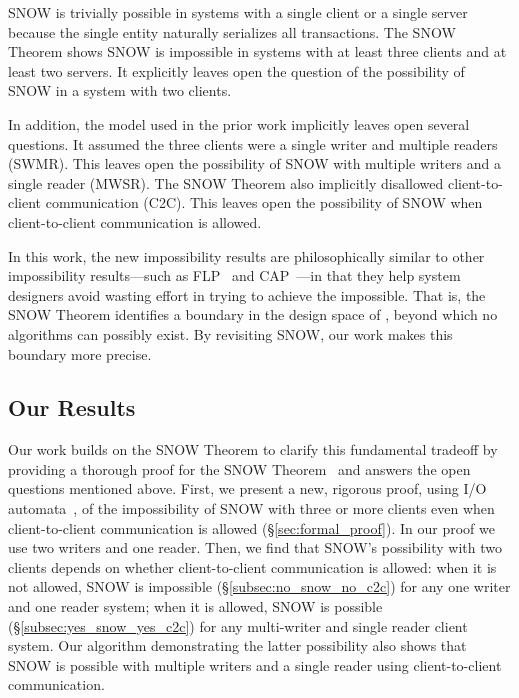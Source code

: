 SNOW is trivially possible in systems with a single client or a single server because the single entity naturally serializes all transactions.
The SNOW Theorem shows SNOW is impossible in systems with at least three clients and at least two servers.
It explicitly leaves open the question of the possibility of SNOW in a system with two clients.

In addition, the model used in the prior work implicitly leaves open several questions.
It assumed the three clients were a single writer and multiple readers (SWMR).
This leaves open the possibility of SNOW with multiple writers and a single reader (MWSR).
The SNOW Theorem also implicitly disallowed client-to-client communication (C2C).
This leaves open the possibility of SNOW when client-to-client communication is allowed.

In this work, the new impossibility results %
are philosophically similar to other impossibility results---such as FLP~\cite{Fischer:pds1983} and CAP~\cite{Brewer:pdc2000, Gilbert:sigact2002}---in that they help system designers avoid wasting effort in trying to achieve the impossible. That is, the SNOW Theorem identifies a boundary in the design space of \rots{}, beyond which no algorithms can possibly exist. By revisiting SNOW, our work makes this boundary more precise.


\subsection{Our Results}
Our work builds on the SNOW Theorem to clarify this fundamental tradeoff by providing a thorough proof for the SNOW Theorem~\cite{SNOW2016} and answers the open questions mentioned above.
First, we present a new, rigorous proof, using I/O automata~\cite{Lynch1996}, of the impossibility of SNOW with three or more clients even when client-to-client communication is allowed (\S\ref{sec:formal_proof}). In our proof we use two writers and one reader.
Then, we find that SNOW's possibility with two clients depends on whether client-to-client communication is allowed:
when it is not allowed, SNOW is impossible (\S\ref{subsec:no_snow_no_c2c}) for any one writer and one reader system;
when it is allowed, SNOW is possible (\S\ref{subsec:yes_snow_yes_c2c}) for any multi-writer and single reader client system.
Our algorithm demonstrating the latter possibility also shows that SNOW is possible with multiple writers and a single reader using client-to-client communication.

